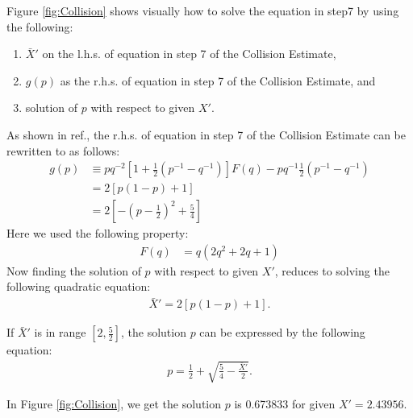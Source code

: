 \documentclass[a3paper,xelatex,english]{bxjsarticle}
\begin{document}
Figure \ref{fig:Collision} shows visually how to solve the equation in step7 by using the following:
\begin{enumerate}
\item $\bar{X}'$ on the l.h.s. of equation in step 7 of the Collision Estimate,
\item $g(p)$ as the r.h.s. of equation in step 7 of the Collision Estimate, and
\item solution of $p$ with respect to given $X'$.
\end{enumerate}
As shown in ref.\cite{ImplementationNotes}, the r.h.s. of equation in step 7 of the Collision Estimate can be rewritten to as follows:
\begin{align}
g(p) & \equiv  p q^{-2} \left[ 1 + \frac{1}{2}(p^{-1} - q^{-1}) \right]F(q) - p q^{-1} \frac{1}{2}(p^{-1} - q^{-1}) \nonumber \\
&= 2 \left[ p(1 - p) + 1 \right] \nonumber \\
&= 2 \left[ -\left(p - \frac{1}{2}\right)^{2} + \frac{5}{4} \right] \label{eq:rhs632}
\end{align}
Here we used the following property:
\begin{align}
F(q) &= q \left( 2q^{2} + 2q + 1 \right) \label{eq:rewFin632final}
\end{align}
Now finding the solution of $p$ with respect to given $X'$, reduces to solving the following quadratic equation:
\begin{align}
\bar{X}' = 2 \left[ p(1 - p) + 1 \right].
\end{align}

If $\bar{X}'$ is in range $[2, \tfrac{5}{2}]$, the solution $p$ can be expressed by the following equation:
\begin{align}
p = \frac{1}{2} + \sqrt{\frac{5}{4} - \frac{\bar{X}'}{2}}.
\end{align}

In Figure \ref{fig:Collision}, we get the solution $p$ is 0.673833 for given $X' = 2.43956$.

\vspace*{8mm}
\end{document}
